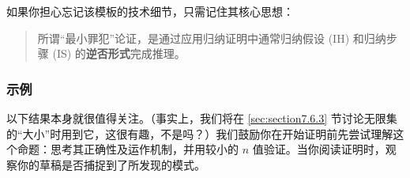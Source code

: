 如果你担心忘记该模板的技术细节，只需记住其核心思想：
\begin{quotation}
    所谓``最小罪犯''论证，是通过应用归纳证明中通常归纳假设 (IH) 和归纳步骤 (IS) 的\textbf{逆否形式}完成推理。
\end{quotation}

\subsubsection*{示例}

以下结果本身就很值得关注。（事实上，我们将在 \ref{sec:section7.6.3} 节讨论无限集的``大小''时用到它，这很有趣，不是吗？）我们鼓励你在开始证明前先尝试理解这个命题：思考其正确性及运作机制，并用较小的 $n$ 值验证。当你阅读证明时，观察你的草稿是否捕捉到了所发现的模式。\\

